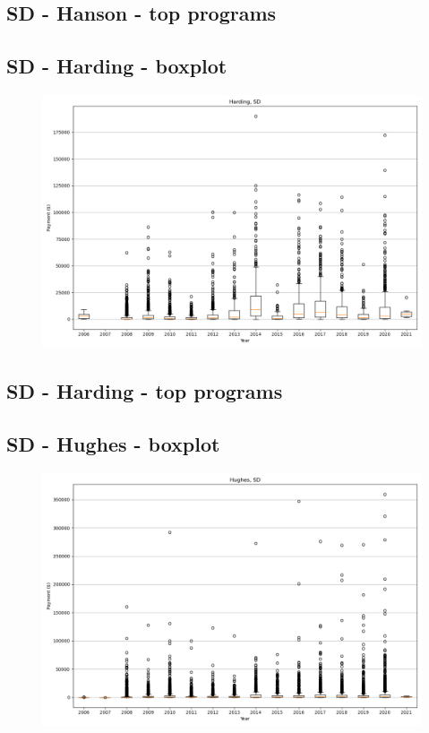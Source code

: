\subsection*{SD - Hanson - top programs}

\newpage
\subsection*{SD - Harding - boxplot}
\begin{figure}[h]
\centering
\includegraphics[width=7in]{../output/boxplots/counties/Harding-SD_boxplot.png}
\end{figure}


\subsection*{SD - Harding - top programs}

\newpage
\subsection*{SD - Hughes - boxplot}
\begin{figure}[h]
\centering
\includegraphics[width=7in]{../output/boxplots/counties/Hughes-SD_boxplot.png}
\end{figure}


